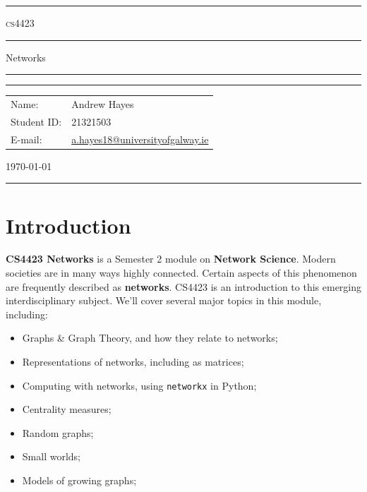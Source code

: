 \documentclass[a4paper,11pt]{article}
\author{Andrew Hayes}
\begin{document}
\begin{titlepage}
    \begin{center}
        \hrule
        \vspace*{0.6cm}
        \Huge \textsc{cs4423}
        \vspace*{0.6cm}
        \hrule
        \LARGE
       \vspace{0.5cm}
       Networks
       \vspace{0.5cm}
       \hrule

       \vfill

       \hrule
        \begin{minipage}{0.495\textwidth} 
            \vspace{0.4em}
            \raggedright
            \normalsize 
            \begin{tabular}{@{}l l}
                Name: & Andrew Hayes \\
                Student ID: & 21321503 \\
                E-mail: & \href{mailto://a.hayes18@universityofgalway.ie}{a.hayes18@universityofgalway.ie} \\
            \end{tabular}
        \end{minipage}
        \begin{minipage}{0.495\textwidth} 
            \raggedleft
            \vspace*{0.8cm}
            \Large
            \today
            \vspace*{0.6cm}
        \end{minipage}
        \medskip\hrule 
    \end{center}
\end{titlepage}

\newpage
\tableofcontents
\newpage
\setcounter{page}{1}

\section{Introduction}
\textbf{CS4423 Networks} is a Semester 2 module on \textbf{Network Science}.
Modern societies are in many ways highly connected.
Certain aspects of this phenomenon are frequently described as \textbf{networks}.
CS4423 is an introduction to this emerging interdisciplinary subject.
We'll cover several major topics in this module, including:
\begin{itemize}
    \item   Graphs \& Graph Theory,  and how they relate to networks;
    \item   Representations of networks, including as matrices;
    \item   Computing with networks, using \texttt{networkx} in Python;
    \item   Centrality measures;
    \item   Random graphs;
    \item   Small worlds;
    \item   Models of growing graphs;
\end{itemize}
\end{document}
